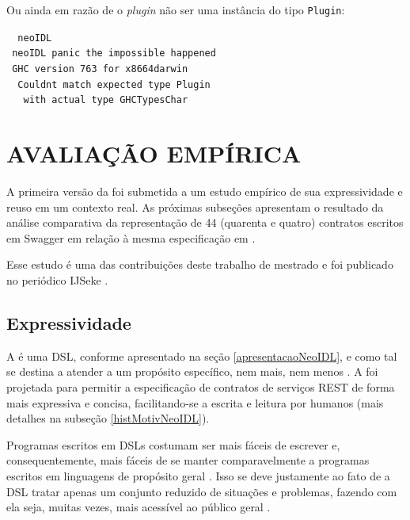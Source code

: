 Ou ainda em razão de o \textit{plugin} não ser uma instância do tipo
\texttt{Plugin}:

\begin{tabbing}\tt
~neoIDL\\
\tt ~neoIDL~panic~the~impossible~happened\\
\tt ~GHC~version~763~for~x8664darwin\\
\tt ~~Couldnt~match~expected~type~Plugin\\
\tt ~~~with~actual~type~GHCTypesChar
\end{tabbing}


\section{AVALIAÇÃO EMPÍRICA}
\label{EstudoExpressividadeReuso}
\vspace{-6mm}

A primeira versão da \neoidl{} foi submetida a um estudo empírico de sua expressividade 
e reuso em um contexto real. As próximas subseções apresentam 
o resultado da análise comparativa da representação de 44 (quarenta e quatro)
contratos escritos em Swagger em relação à mesma especificação em \neoidl{}.

Esse estudo é uma das contribuições deste trabalho de mestrado e foi publicado
no periódico IJSeke \cite{lima2015neoidl}.

\subsection{Expressividade}
\label{estudoExpressividadeNeoIDL}
\vspace{-6mm}

A \neoidl{} é uma DSL, conforme apresentado na seção \ref{apresentacaoNeoIDL},
e como tal se destina a atender a um propósito específico, nem mais, nem menos
\cite{hudak1998modular}. A \neoidl{} foi projetada para permitir a
especificação de contratos de serviços REST de forma mais expressiva e concisa,
facilitando-se a escrita e leitura por humanos (mais detalhes na subseção
\ref{histMotivNeoIDL}).

Programas escritos em DSLs costumam ser mais fáceis de escrever e,
consequentemente, mais fáceis de se manter comparavelmente a programas escritos
em linguagens de propósito geral \cite{hudak1998modular}. Isso se deve
justamente ao fato de a DSL tratar apenas um conjunto reduzido de situações e
problemas, fazendo com ela seja, muitas vezes, mais acessível ao público geral
\cite{taha2008domain}.

